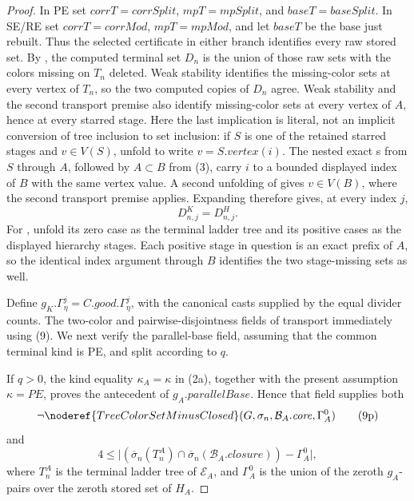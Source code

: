 \begin{proof}
In PE set \(\mathit{corrT}=\mathit{corrSplit}\),
\(\mathit{mpT}=\mathit{mpSplit}\), and
\(\mathit{baseT}=\mathit{baseSplit}\).  In SE/RE set
\(\mathit{corrT}=\mathit{corrMod}\),
\(\mathit{mpT}=\mathit{mpMod}\), and let \(\mathit{baseT}\) be the base
just rebuilt.  Thus the selected certificate in either branch identifies
every raw stored set.  By , the computed terminal set
\(D_n\) is the union of those raw sets with the colors missing on \(T_n\)
deleted.  Weak stability identifies the missing-color sets at every
vertex of \(T_n\), so the two computed copies of \(D_n\) agree.  Weak
stability and the second transport premise also identify missing-color
sets at every vertex of \(A\), hence at every starred stage.  Here the
last implication is literal, not an implicit conversion of tree inclusion
to set inclusion: if \(S\) is one of the retained starred stages and
\(v\in V(S)\), unfold  to write
\(v=S.\mathit{vertex}(i)\).  The nested exact
s from \(S\) through \(A\), followed
by \(A\subset B\) from (3), carry \(i\) to a bounded displayed index of
\(B\) with the same vertex value.  A second unfolding of
 gives \(v\in V(B)\), where the second
transport premise applies.  Expanding
 therefore gives, at every index \(j\),
\[
                         D^K_{n,j}=D^H_{n,j}.                  \tag{9}
\]
For , unfold its zero case as the
terminal ladder tree and its positive cases as the displayed hierarchy
stages.  Each positive stage in question is an exact prefix of \(A\), so
the identical  index argument through
\(B\) identifies the two stage-missing sets as well.

Define \(g_K.\Gamma^j_\eta=C.\mathit{good}.\Gamma^j_\eta\), with the
canonical casts supplied by the equal divider counts.  The two-color and
pairwise-disjointness fields of  transport
immediately using (9).  We next verify the parallel-base field, assuming
that the common terminal kind is PE, and split according to \(q\).

If \(q>0\), the kind equality \(\kappa_A=\kappa\) in (2a), together with
the present assumption \(\kappa=PE\), proves the antecedent of
\(g_A.\mathit{parallelBase}\).  Hence that field supplies both
\[
 \neg\noderef{TreeColorSetMinusClosed}
   (G,\sigma_n,\mathcal B_A.\mathit{core},\Gamma_A^0)            \tag{9p}
\]
and
\[
 4\leq\bigl|(\overline\sigma_n(T_n^A)\cap
       \overline\sigma_n(\mathcal B_A.\mathit{closure}))
       -\Gamma_A^0\bigr|,                                       \tag{9q}
\]
where \(T_n^A\) is the terminal ladder tree of \(\mathcal E_A\), and
\(\Gamma_A^0\) is the union of the zeroth \(g_A\)-pairs over the zeroth
stored set of \(H_A\).


\end{proof}
